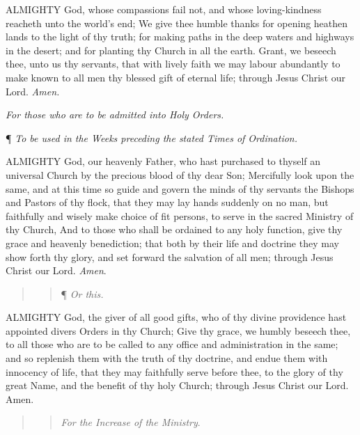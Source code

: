 ALMIGHTY
God, whose compassions fail not, and whose loving-kindness reacheth unto
the world’s end; We give thee humble thanks for opening heathen
lands to the light of thy truth; for making paths in the deep waters and
highways in the desert; and for planting thy Church in all the earth.
Grant, we beseech thee, unto us thy servants, that with lively faith we
may labour abundantly to make known to all men thy blessed gift of eternal
life; through Jesus Christ our Lord. \emph{Amen.}

\emph{For
those who are to be admitted into Holy Orders.}

¶
\emph{To be used in the Weeks preceding the stated Times of Ordination.}

ALMIGHTY
God, our heavenly Father, who hast purchased to thyself an universal Church
by the precious blood of thy dear Son; Mercifully look upon the same,
and at this time so guide and govern the minds of thy servants the Bishops
and Pastors of thy flock, that they may lay hands suddenly on no man,
but faithfully and wisely make choice of fit persons, to serve in the
sacred Ministry of thy Church, And to those who shall be ordained to any
holy function, give thy grace and heavenly benediction; that both by their
life and doctrine they may show forth thy glory, and set forward the salvation
of all men; through Jesus Christ our Lord. \emph{Amen}.

\begin{quote}

\begin{quote}

¶
\emph{Or this.}

\end{quote}

\end{quote}

ALMIGHTY
God, the giver of all good gifts, who of thy divine providence hast appointed
divers Orders in thy Church; Give thy grace, we humbly beseech thee, to
all those who are to be called to any office and administration in the
same; and so replenish them with the truth of thy doctrine, and endue
them with innocency of life, that they may faithfully serve before thee,
to the glory of thy great Name, and the benefit of thy holy Church; through
Jesus Christ our Lord. Amen.

\begin{quote}

\begin{quote}

\emph{For
the Increase of the Ministry}.

\end{quote}

\end{quote}

